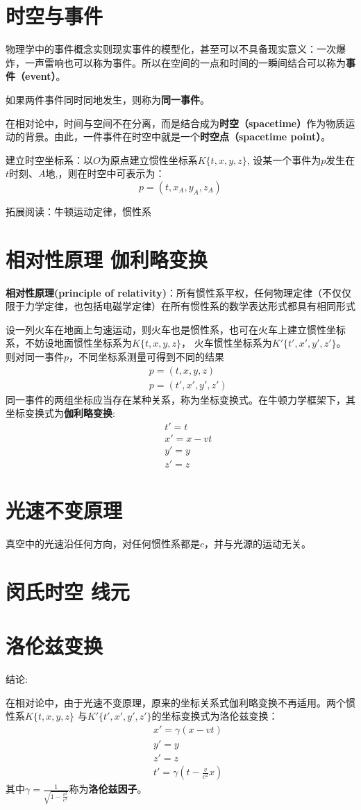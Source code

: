 \documentclass[11pt]{article}
\newcommand{\be}{\begin{equation}}
\newcommand{\ee}{\end{equation}}
\newcommand{\bea}{\setlength\arraycolsep{2pt} \begin{eqnarray}}
\newcommand{\eea}{\end{eqnarray}}
\numberwithin{equation}{section}
\begin{document}
\begin{CJK}{GBK}{song}
\section{时空与事件}
物理学中的事件概念实则现实事件的模型化，甚至可以不具备现实意义：一次爆炸，一声雷响也可以称为事件。所以在空间的一点和时间的一瞬间结合可以称为\textbf{事件（event）}。

如果两件事件同时同地发生，则称为\textbf{同一事件}。

在相对论中，时间与空间不在分离，而是结合成为\textbf{时空（spacetime）}作为物质运动的背景。由此，一件事件在时空中就是一个\textbf{时空点（spacetime point）}。

建立时空坐标系：以$O$为原点建立惯性坐标系$K\{t,x,y,z\}$, 设某一个事件为$p$发生在$t$时刻、$A$地,，则在时空中可表示为：
\be
p=(t,x_A,y_A,z_A)
\ee

拓展阅读：牛顿运动定律，惯性系
\section{相对性原理 伽利略变换}
\textbf{相对性原理(principle of relativity)}：所有惯性系平权，任何物理定律（不仅仅限于力学定律，也包括电磁学定律）在所有惯性系的数学表达形式都具有相同形式

设一列火车在地面上匀速运动，则火车也是惯性系，也可在火车上建立惯性坐标系，不妨设地面惯性坐标系为$K\{t,x,y,z\}$， 火车惯性坐标系为$K' \{t',x',y',z'\}$。则对同一事件$p$，不同坐标系测量可得到不同的结果
\bea
&&p=(t,x,y,z) \\
&&p=(t',x',y',z')
\eea
同一事件的两组坐标应当存在某种关系，称为坐标变换式。在牛顿力学框架下，其坐标变换式为\textbf{伽利略变换}:
\bea
&&t'=t \\
&&x'=x-vt \\
&&y'=y\\
&&z'=z
\eea
\section{光速不变原理}
真空中的光速沿任何方向，对任何惯性系都是$c$，并与光源的运动无关。
\section{闵氏时空 线元}
\section{洛伦兹变换}
结论:


在相对论中，由于光速不变原理，原来的坐标关系式伽利略变换不再适用。两个惯性系$K\{t,x,y,z\}$ 与$K' \{t',x',y',z'\}$的坐标变换式为洛伦兹变换：
\bea
&&x'=\gamma(x-vt)\\
&&y'=y\\
&&z'=z\\
&&t'=\gamma(t-\frac{v}{c^2}x)
\eea
其中$\gamma=\frac{1}{\sqrt{1-\frac{v^2}{c^2}}}$称为\textbf{洛伦兹因子}。



\end{CJK}
\end{document}
